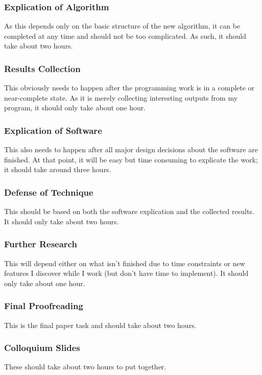 \documentclass[10pt]{article}
\begin{document}
\subsubsection{Explication of Algorithm}
As this depends only on the basic structure of the new algorithm, it can be
completed at any time and should not be too complicated. As such, it should
take about two hours.

\subsubsection{Results Collection}
This obviously needs to happen after the programming work is in a complete or
near-complete state. As it is merely collecting interesting outputs from my
program, it should only take about one hour.

\subsubsection{Explication of Software}
This also needs to happen after all major design decisions about the software
are finished. At that point, it will be easy but time consuming to explicate
the work; it should take around three hours.

\subsubsection{Defense of Technique}
This should be based on both the software explication and the collected
results. It should only take about two hours.

\subsubsection{Further Research}
This will depend either on what isn't finished due to time constraints or new
features I discover while I work (but don't have time to implement). It should
only take about one hour.

\subsubsection{Final Proofreading}
This is the final paper task and should take about two hours.

\subsubsection{Colloquium Slides}
These should take about two hours to put together.
\end{document}
